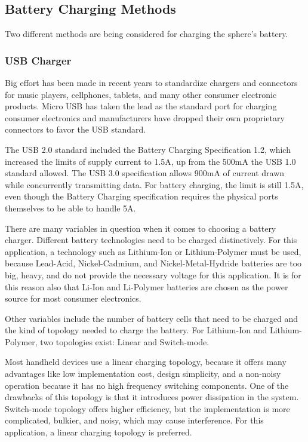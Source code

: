 \subsection{Battery Charging Methods}
Two different methods are being considered for charging the sphere's battery.
\subsubsection{USB Charger}
Big effort has been made in recent years to standardize chargers and connectors for music players, cellphones, tablets, and many other consumer electronic products. Micro USB has taken the lead as the standard port for charging consumer electronics and manufacturers have dropped their own proprietary connectors to favor the USB standard.

The USB 2.0 standard included the Battery Charging Specification 1.2, which increased the limits of supply current to 1.5A, up from the 500mA the USB 1.0 standard allowed. The USB 3.0 specification allows 900mA of current drawn while concurrently transmitting data. For battery charging, the limit is still 1.5A, even though the Battery Charging specification requires the physical ports themselves to be able to handle 5A.

There are many variables in question when it comes to choosing a battery charger. Different battery technologies need to be charged distinctively. For this application, a technology such as Lithium-Ion or Lithium-Polymer must be used, because Lead-Acid, Nickel-Cadmium, and Nickel-Metal-Hydride batteries are too big, heavy, and do not provide the necessary voltage for this application. It is for this reason also that Li-Ion and Li-Polymer batteries are chosen as the power source for most consumer electronics.

Other variables include the number of battery cells that need to be charged and the kind of topology needed to charge the battery. For Lithium-Ion and Lithium-Polymer, two topologies exist: Linear and Switch-mode.

Most handheld devices use a linear charging topology, because it offers many advantages like low implementation cost, design simplicity, and a non-noisy operation because it has no high frequency switching components. One of the drawbacks of this topology is that it introduces power dissipation in the system. Switch-mode topology offers higher efficiency, but the implementation is more complicated, bulkier, and noisy, which may cause interference. For this application, a linear charging topology is preferred.

